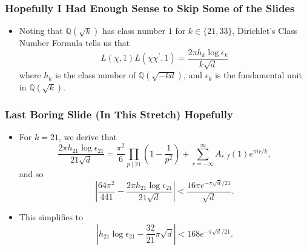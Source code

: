 \documentclass{beamer}
\begin{document}
\begin{frame}

	\frametitle{Hopefully I Had Enough Sense to Skip Some of the Slides}

	\begin{itemize}

		\item Noting that $\mathbb{Q}(\sqrt{k})$ has class number $1$ for $k \in \{21, 33\}$, Dirichlet's Class Number Formula tells us that
			\[
				L(\chi, 1) L(\chi \chi^\prime, 1) = \frac{2 \pi h_k \log \epsilon_k}{k \sqrt{d}}
			\]
			where $h_k$ is the class number of $\mathbb{Q}(\sqrt{-kd})$, and $\epsilon_k$ is the fundamental unit in $\mathbb{Q}(\sqrt{k})$.


	\end{itemize}

\end{frame}

\begin{frame}

	\frametitle{Last Boring Slide (In This Stretch) Hopefully}

	\begin{itemize}
		
		\item For $k = 21$, we derive that 
			\[
				\frac{2 \pi h_{21} \log \epsilon_{21}}{21 \sqrt{d}} = \frac{\pi^2}{6} \prod_{p \mid 21} \left(1 - \frac{1}{p^2} \right) + \sum_{r = -\infty}^{\infty} A_{r, f}(1) e^{\pi i r / k},
			\]
			and so
			\[
				\left| \frac{64 \pi^2}{441} - \frac{2 \pi h_{21} \log \epsilon_{21}}{21 \sqrt{d}} \right| < \frac{16 \pi e^{-\pi \sqrt{d} / 21}}{\sqrt{d}}.
			\]
			\pause

		\item This simplifies to
			\[
				\left| h_{21} \log \epsilon_{21} - \frac{32}{21} \pi \sqrt{d} \right| < 168 e^{-\pi \sqrt{d} / 21}.
			\]
	\end{itemize}

\end{frame}
\end{document}
